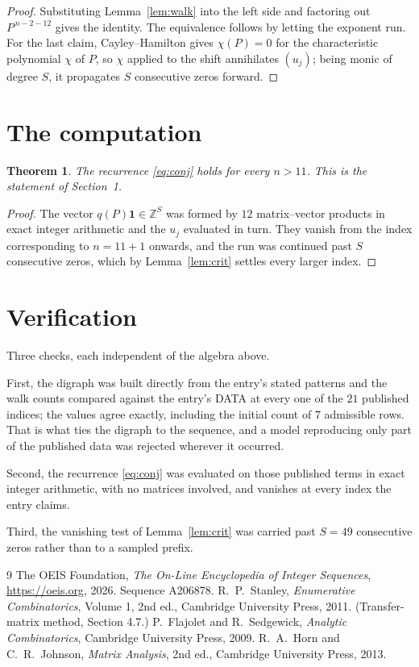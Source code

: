 \documentclass[11pt,a4paper]{article}
\theoremstyle{plain}
\newtheorem{theorem}{Theorem}
\theoremstyle{definition}
\begin{document}
\begin{proof}
Substituting Lemma~\ref{lem:walk} into the left side and factoring out
$P^{\,n-2-12}$ gives the identity. The equivalence follows by letting the exponent
run. For the last claim, Cayley--Hamilton gives $\chi(P)=0$ for the characteristic
polynomial $\chi$ of $P$, so $\chi$ applied to the shift annihilates $(u_j)$; being monic of
degree $S$, it propagates $S$ consecutive zeros forward.
\end{proof}

\section{The computation}

\begin{theorem}
The recurrence \eqref{eq:conj} holds for every $n>11$. This is the statement of
Section~1.
\end{theorem}

\begin{proof}
The vector $q(P)\mathbf{1}\in\mathbb{Z}^{S}$ was formed by $12$ matrix--vector
products in exact integer arithmetic and the $u_j$ evaluated in turn. They vanish from the
index corresponding to $n=11+1$ onwards, and the run was continued past $S$ consecutive
zeros, which by Lemma~\ref{lem:crit} settles every larger index.
\end{proof}

\section{Verification}

Three checks, each independent of the algebra above.

First, the digraph was built directly from the entry's stated patterns and the walk counts
compared against the entry's DATA at every one of the $21$ published indices; the
values agree exactly, including the initial count of $7$ admissible rows. That is
what ties the digraph to the sequence, and a model reproducing only part of the published
data was rejected wherever it occurred.

Second, the recurrence \eqref{eq:conj} was evaluated on those published terms in exact
integer arithmetic, with no matrices involved, and vanishes at every index the entry claims.

Third, the vanishing test of Lemma~\ref{lem:crit} was carried past $S=49$ consecutive
zeros rather than to a sampled prefix.

\begin{thebibliography}{9}
 The OEIS Foundation, \emph{The On-Line Encyclopedia of Integer
Sequences}, \url{https://oeis.org}, 2026. Sequence A206878.
 R.~P.~Stanley, \emph{Enumerative Combinatorics}, Volume 1, 2nd ed.,
Cambridge University Press, 2011. (Transfer-matrix method, Section 4.7.)
 P.~Flajolet and R.~Sedgewick, \emph{Analytic Combinatorics}, Cambridge
University Press, 2009.
 R.~A.~Horn and C.~R.~Johnson, \emph{Matrix Analysis}, 2nd ed., Cambridge
University Press, 2013.
\end{thebibliography}
\end{document}
